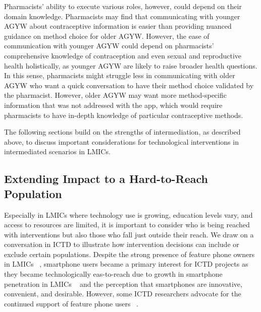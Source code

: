 Pharmacists’ ability to execute various roles, however, could depend on their domain knowledge. Pharmacists may find that communicating with younger AGYW about contraceptive information is easier than providing nuanced guidance on method choice for older AGYW. However, the ease of communication with younger AGYW could depend on pharmacists’ comprehensive knowledge of contraception and even sexual and reproductive health holistically, as younger AGYW are likely to raise broader health questions. In this sense, pharmacists might struggle less in communicating with older AGYW who want a quick conversation to have their method choice validated by the pharmacist. However, older AGYW may want more method-specific information that was not addressed with the app, which would require pharmacists to have in-depth knowledge of particular contraceptive methods.

The following sections build on the strengths of intermediation, as described above, to discuss important considerations for technological interventions in intermediated scenarios in LMICs.
 
\subsection{Extending Impact to a Hard-to-Reach Population}

Especially in LMICs where technology use is growing, education levels vary, and access to resources are limited, it is important to consider who is being reached with interventions but also those who fall just outside their reach. We draw on a conversation in ICTD to illustrate how intervention decisions can include or exclude certain populations. Despite the strong presence of feature phone owners in LMICs ~\cite{Silver_Johnson_2018, Kenya_2023, Tanzania_2015, Uganda_2022}, smartphone users became a primary interest for ICTD projects as they became technologically eas-to-reach due to growth in smartphone penetration in LMICs ~\cite{Delaporte_Bahia_2022} and the perception that smartphones are innovative, convenient, and desirable. However, some ICTD researchers advocate for the continued support of feature phone users ~\cite{10.1145/3613904.3642099, 10.1145/3555648, doi:10.1177/2050157918776684}. %

